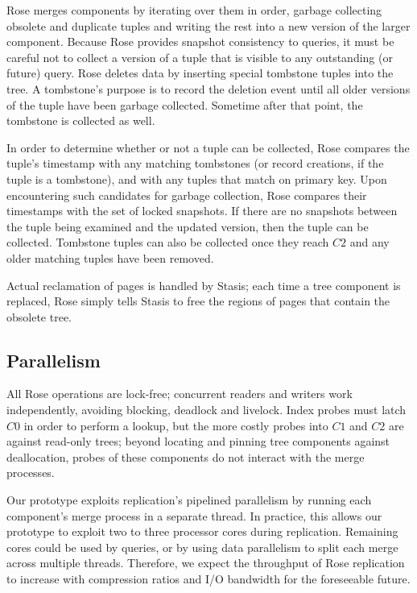 \documentclass{vldb}
\newcommand{\rows}{Rose\xspace}
\begin{document}
\rows merges components by iterating over them in order, garbage collecting
obsolete and duplicate tuples and writing the rest into a new version
of the larger component.  Because \rows provides snapshot consistency
to queries, it must be careful not to collect a version of a tuple that
is visible to any outstanding (or future) query.  \rows
deletes data by
inserting special tombstone tuples into the tree.  A tombstone's
purpose is to record the deletion event until all older versions of
the tuple have been garbage collected.  Sometime after that point, the tombstone
is collected as well.

In order to determine whether or not a tuple can be collected, \rows
compares the tuple's timestamp with any matching tombstones (or record
creations, if the tuple is a tombstone), and with any tuples that
match on primary key.  Upon encountering such candidates for garbage collection,
\rows compares their timestamps with the set of locked snapshots.  If
there are no snapshots between the tuple being examined and the
updated version, then the tuple can be collected.  Tombstone tuples can
also be collected once they reach $C2$ and any older matching tuples
have been removed.

Actual reclamation of pages is handled by Stasis; each time a tree
component is replaced, \rows simply tells Stasis to free the regions of
pages that contain the obsolete tree.


\subsection{Parallelism}

All \rows
operations are lock-free; concurrent readers and writers work
independently, avoiding blocking, deadlock and livelock.  Index probes
must latch $C0$ in order to perform a lookup, but the more costly
probes into $C1$ and $C2$ are against read-only trees; beyond locating
and pinning tree components against deallocation, probes of these
components do not interact with the merge processes.

Our prototype exploits replication's pipelined parallelism by running
each component's merge process in a separate thread.  In practice,
this allows our prototype to exploit two to three processor cores
during replication.  Remaining cores could be used by queries, or
by using data parallelism to split each merge across multiple threads.
Therefore, we expect the throughput of \rows replication to increase
with compression ratios and I/O bandwidth for the foreseeable future.
\end{document}
